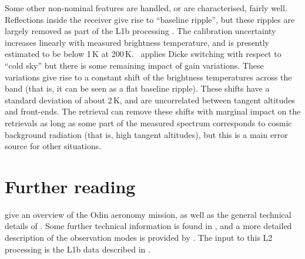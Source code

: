 Some other non-nominal features are handled, or are characterised, fairly well.
Reflections inside the receiver give rise to ``baseline ripple'', but these
ripples are largely removed as part of the L1b processing \citep{atbdl1b}. The
calibration uncertainty increases linearly with measured brightness
temperature, and is presently estimated to be below 1\,K at 200\,K. \smr\
applies Dicke switching with respect to ``cold sky'' but there is some
remaining impact of gain variations. These variations give rise to a constant
shift of the brightness temperatures across the band (that is, it can be seen
as a flat baseline ripple). These shifts have a standard deviation of about
2\,K, and are uncorrelated between tangent altitudes and front-ends. The
retrieval can remove these shifts with marginal impact on the retrievals as
long as some part of the measured spectrum corresponds to cosmic background
radiation (that is, high tangent altitudes), but this is a main error source
for other situations.



\section{Further reading}
\label{sec:reading}
%
\citet{murtagh:anove:02} give an overview of the Odin aeronomy mission, as well
as the general technical details of \smr. Some further technical information is
found in \citet{eriksson:studi:02}, and a more detailed description of the
observation modes is provided by \citet{merino:studi:02}. The input to this L2
processing is the L1b data described in \citet{atbdl1b}.




